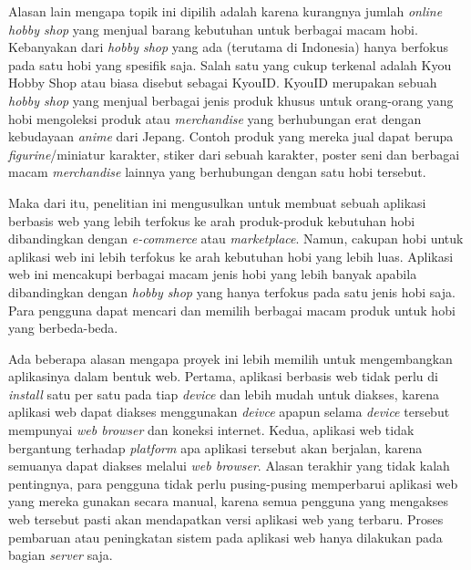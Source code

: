 \documentclass[a4paper]{article}
\begin{document}
Alasan lain mengapa topik ini dipilih adalah karena kurangnya jumlah \textit{online hobby shop} yang menjual barang kebutuhan untuk berbagai macam hobi. Kebanyakan dari \textit{hobby shop} yang ada (terutama di Indonesia) hanya berfokus pada satu hobi yang spesifik saja. Salah satu yang cukup terkenal adalah Kyou Hobby Shop atau biasa disebut sebagai KyouID. KyouID merupakan sebuah \textit{hobby shop} yang menjual berbagai jenis produk khusus untuk orang-orang yang hobi mengoleksi produk atau \textit{merchandise} yang berhubungan erat dengan kebudayaan \textit{anime} dari Jepang. Contoh produk yang mereka jual dapat berupa \textit{figurine}/miniatur karakter, stiker dari sebuah karakter, poster seni dan berbagai macam \textit{merchandise} lainnya yang berhubungan dengan satu hobi tersebut.

Maka dari itu, penelitian ini mengusulkan untuk membuat sebuah aplikasi berbasis web yang lebih terfokus ke arah produk-produk kebutuhan hobi dibandingkan dengan \textit{e-commerce} atau \textit{marketplace}. Namun, cakupan hobi untuk aplikasi web ini lebih terfokus ke arah kebutuhan hobi yang lebih luas. Aplikasi web ini mencakupi berbagai macam jenis hobi yang lebih banyak apabila dibandingkan dengan \textit{hobby shop} yang hanya terfokus pada satu jenis hobi saja. Para pengguna dapat mencari dan memilih berbagai macam produk untuk hobi yang berbeda-beda.

Ada beberapa alasan mengapa proyek ini lebih memilih untuk mengembangkan aplikasinya dalam bentuk web. Pertama, aplikasi berbasis web tidak perlu di \textit{install} satu per satu pada tiap \textit{device} dan lebih mudah untuk diakses, karena aplikasi web dapat diakses menggunakan \textit{deivce} apapun selama \textit{device} tersebut mempunyai \textit{web browser} dan koneksi internet. Kedua, aplikasi web tidak bergantung terhadap \textit{platform} apa aplikasi tersebut akan berjalan, karena semuanya dapat diakses melalui \textit{web browser}. Alasan terakhir yang tidak kalah pentingnya, para pengguna tidak perlu pusing-pusing memperbarui aplikasi web yang mereka gunakan secara manual, karena semua pengguna yang mengakses web tersebut pasti akan mendapatkan versi aplikasi web yang terbaru. Proses pembaruan atau peningkatan sistem pada aplikasi web hanya dilakukan pada bagian \textit{server} saja.
\end{document}
